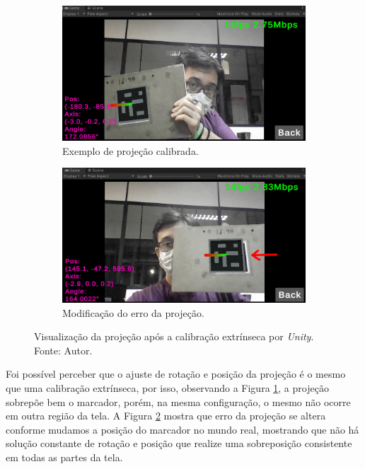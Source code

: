\begin{figure}[H]
    \centering
    \begin{subfigure}{.45\textwidth}
        \centering
        \includegraphics[width=.95\linewidth]{figuras/vcranium-extr1.png}
        \caption{Exemplo de projeção calibrada.}
        \label{fig:extr1}
    \end{subfigure}
    \begin{subfigure}{.45\textwidth}
        \centering
        \includegraphics[width=.95\linewidth]{figuras/vcranium-extr2.png}
        \caption{Modificação do erro da projeção.}
        \label{fig:extr2}
    \end{subfigure}
    \caption{Visualização da projeção após a calibração extrínseca por \textit{Unity}. Fonte: Autor.}
    \label{fig:extr-comp}
\end{figure}

Foi possível perceber que o ajuste de rotação e posição da projeção é o mesmo que uma calibração extrínseca, por isso, observando a Figura \ref{fig:extr1}, a projeção sobrepõe bem o marcador, porém, na mesma configuração, o mesmo não ocorre em outra região da tela. A Figura \ref{fig:extr2} mostra que erro da projeção se altera conforme mudamos a posição do marcador no mundo real, mostrando que não há solução constante de rotação e posição que realize uma sobreposição consistente em todas as partes da tela.

